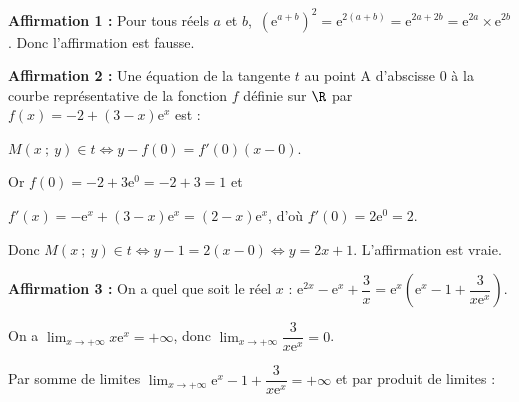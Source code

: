 
\smallskip

%



\medskip

\textbf{Affirmation 1 :} Pour tous réels $a$ et $b$,\, $\left(\text{e}^{a+b}\right)^2 =
 \text{e}^{2(a + b)} =  \text{e}^{2a + 2b} = \text{e}^{2a} \times \text{e}^{2b}$. Donc l'affirmation est fausse.

\smallskip
\textbf{Affirmation 2 :}  %
Une équation de la tangente $t$ au point A d'abscisse 0 à la courbe représentative de la fonction $f$ définie sur $\R$ par $f(x) = - 2 + (3 - x)\text{e}^x$ est :

$M(x~;~y) \in t \iff y - f(0) = f'(0)(x - 0)$.

Or $f(0) = - 2 + 3\text{e}^0 = - 2 + 3 = 1$ et 

$f'(x) = -\text{e}^x + (3 - x)\text{e}^x = (2 - x)\text{e}^x$, d'où $f'(0) = 2\text{e}^0 = 2$.

Donc $M(x~;~y) \in t \iff y - 1 = 2(x - 0) \iff y = 2x + 1$. L'affirmation est vraie.

\smallskip

\textbf{Affirmation 3 :} %
On a quel que soit le réel $x$ : $\text{e}^{2x} - \text{e}^{x} + \dfrac{3}{x}= \text{e}^{x}\left(\text{e}^{x} - 1 + \dfrac{3}{x\text{e}^{x}}\right)$.

On a $\displaystyle\lim_{x \to + \infty} x\text{e}^{x} = + \infty$, donc $\displaystyle\lim_{x \to + \infty} \dfrac{3}{x\text{e}^{x}} = 0$.

Par somme de limites $\displaystyle\lim_{x \to + \infty}\text{e}^{x} - 1 + \dfrac{3}{x\text{e}^{x}} = + \infty$ et par produit de limites :

